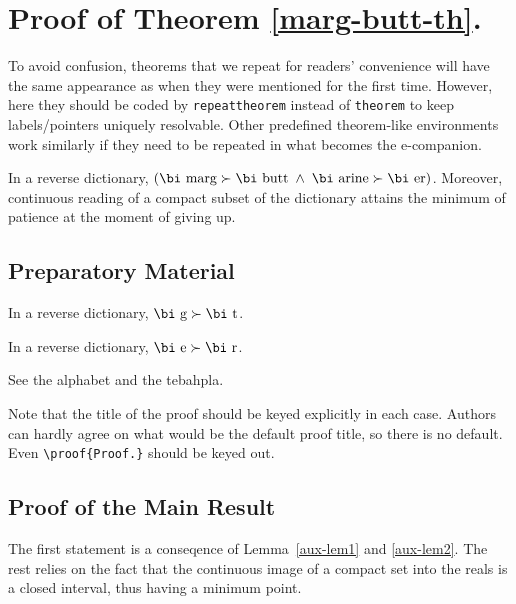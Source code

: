 \documentclass[serv,blindrev]{informs-serv}
\begin{document}
\section{Proof of Theorem \ref{marg-butt-th}.}

To avoid confusion, theorems that we repeat for readers' convenience
will have the same appearance as when they were mentioned for the first
time. However, here they should be coded by \verb+repeattheorem+ instead
of \verb+theorem+ to keep labels/pointers uniquely resolvable. Other predefined theorem-like
environments work similarly if they need to be repeated in what becomes the \mbox{e-companion.}


\begin{repeattheorem}[Theorem 1.]
In a reverse dictionary, $(\mbox{\bi marg}\succ\mbox{\bi butt\/}\; \land\;  
\mbox{\bi arine}\succ\mbox{\bi er})$.
Moreover, continuous reading of a compact subset of the dictionary
attains the minimum of patience at the moment of giving up.
\end{repeattheorem}

\subsection{Preparatory Material}

\begin{lemma}
\label{aux-lem1}
In a reverse dictionary, $\mbox{\bi g}\succ\mbox{\bi t\/}$.
\end{lemma}

\begin{lemma}
\label{aux-lem2}
In a reverse dictionary, $\mbox{\bi e}\succ\mbox{\bi r\/}$.
\end{lemma}

 See the alphabet and the tebahpla.\Halmos
\endproof

\begin{remark} 
Note that the title of the proof should be keyed
explicitly in each case. Authors can hardly agree on what would be the
default proof title, so there is no default. Even \verb+\proof{Proof.}+ should be keyed out. 
\end{remark}


\subsection{Proof of the Main Result}

 The first statement is a conseqence of
Lemma~\ref{aux-lem1} and \ref{aux-lem2}. The rest relies on the fact that the continuous
image of a compact set into the reals is a closed interval, thus having
a minimum point.\Halmos 
\endproof
\end{document}
